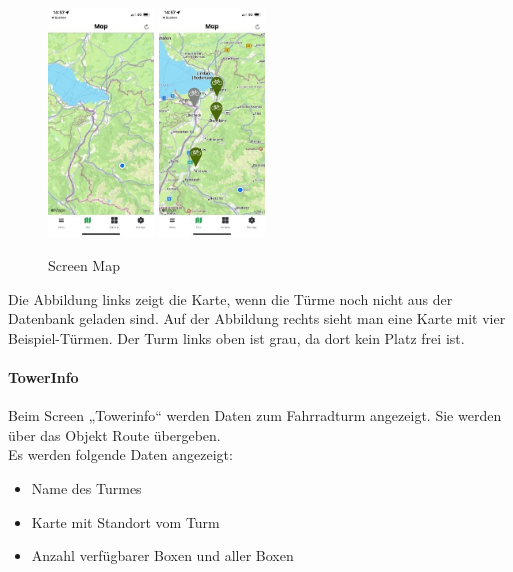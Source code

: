 \begin{figure}[H]
    \centering
    \includegraphics[width=0.25\textwidth]{images/app-screenshots/screenmapa.jpg}
    \includegraphics[width=0.25\textwidth]{images/app-screenshots/screenmapb.jpg}
    \caption{Screen Map}
    \label{fig:screenmap}
\end{figure}

Die Abbildung links zeigt die Karte, wenn die Türme noch nicht aus der Datenbank geladen sind.
Auf der Abbildung rechts sieht man eine Karte mit vier Beispiel-Türmen. Der Turm links oben ist grau, da dort kein Platz frei ist. \\

\paragraph{TowerInfo}Beim Screen „Towerinfo“ werden Daten zum Fahrradturm angezeigt. Sie werden über das Objekt Route übergeben.\\
Es werden folgende Daten angezeigt:
\begin{itemize}
    \item Name des Turmes
    \item Karte mit Standort vom Turm
    \item Anzahl verfügbarer Boxen und aller Boxen
\end{itemize}

